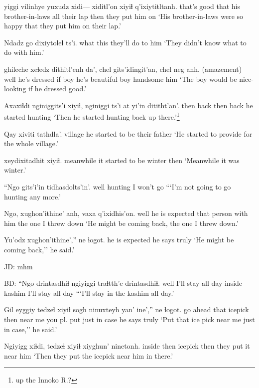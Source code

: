 \documentclass[12pt]{article}
\begin{document}
 yiggi vilinhye            yuxudz xidi--- xiditl'on xiyiɬ q'ixiytitltanh.   
{that's good}     that  {his brother-in-laws} all {} {their lap} then  {they put him on} 
\glt `His brother-in-laws were so happy that they put him on their lap.'
\glend

\gll Ndadz go dixiytoleɬ ts'i. 
what  this   {they'll do to him}
\glt `They didn't know what to do with him.'
\glend

 ghileche xeɬedz dithitl'enh   da', chel gits'idingit'an, chel neg anh.
{(amazement)} {}       well   {he's dressed} if boy  {he's beautiful}  boy  handsome him
\glt `The boy would be nice-looking if he dressed good.'
\glend

\gll Axaxiɬdi nginiggits'i xiyiɬ, {nginiggi} {ts'i at} {yi'in dititht'an'.}
then     {back }     then  {back} {}       {he started hunting}
\glt `Then he started hunting back up there.'\footnote{up the Innoko R.?}
\glend

\gll Qay     {xiviti tathdla'.}
village {he started to be their father}
\glt `He started to provide for the whole village.'
\glend

 xeydixitadhit          xiyiɬ.
meanwhile   {it started to be winter} then
\glt `Meanwhile it was winter.'
\glend

\gll ``Ngo  gits'i'in {tidhasdolts'in'.}
well hunting   {I won't go}
\glt ```I'm not going to go hunting any more.'
\glend

\gll Ngo, {xughon'ithine'}  anh, vaxa {q'ixidhis'on.}
well {he is expected}      {that person} {with him} {the one I threw down} 
\glt `He might be coming back, the one I threw down.'
\glend

\gll Yu'odz xughon'ithine','' ne      ɬogot.
{} {he is expected}  he says truly
\glt `He might be coming back,'' he said.'
\glend

JD:  mhm

BD:  
\gll ``Ngo  drintasdhiɬ       ngiyiggi traɬtth'e drintasdhiɬ.
well {I'll stay all day} inside   kashim   {I'll stay all day}
\glt ```I'll stay in the kashim all day.'
\glend

\gll Gil  eyggiy tedzeɬ  xiyiɬ sogh    ninuxteyh   {yan' ine',}''     ne      ɬogot.
{go ahead} that   icepick then {near me} {you pl. put} {just in case} {he says} truly
\glt `Put that ice pick near me just in case,'' he said.'
\glend

\gll Ngiyigg xiɬdi, tedzeɬ xiyiɬ  {xiyghun' ninetonh.}
inside  then   icepick then {they put it near him}
\glt `Then they put the icepick near him in there.'
\glend
 
\end{document}
